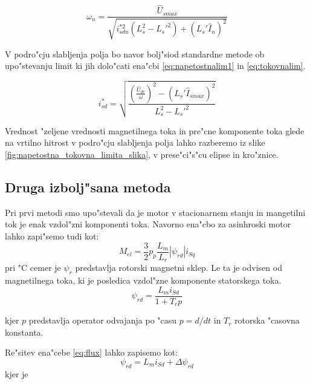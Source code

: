 \documentclass[journal,a4paper,twoside]{sty/IEEEtran}
\begin{document}
\begin{equation}
\omega_n=\frac{\hat{U}_{smax}}{\sqrt{i_{sdn}^{*2}(L_s^2-L_s'^2)+(L_s'\hat{I}_n)^2}}
\label{nazivnaw}
\end{equation}



V podro"cju slabljenja polja bo navor bolj"siod standardne metode ob upo"stevanju limit ki jih dolo"cati ena"cbi \ref{eq:napetostnalim1} in \ref{eq:tokovnalim}. 

\begin{equation}
\label{eq:zeljentok1}
i_{sd}^*=\sqrt{\frac{(\frac{\hat{U}_{dc}}{\omega})^2-(L_s'\hat{I}_{smax})^2}{L_s^2-L_s'^2}}
\end{equation}

Vrednost "zeljene vrednosti magnetilnega toka in pre"cne komponente toka glede na vrtilno hitrost v podro"cju slabljenja polja lahko razberemo iz slike \ref{fig:napetostna_tokovna_limita_slika}, v prese"ci"s"cu elipse in kro"znice. 














\subsection{Druga izbolj"sana metoda}


Pri prvi metodi smo upo"stevali da je motor v stacionarnem stanju in mangetilni tok je enak vzdol"zni komponenti toka.
Navorno ena"cbo za asinhroski motor lahko zapi"semo tudi kot:
\begin{equation}
\label{eq:navor2}
M_{el}=\frac{3}{2}p_p \frac{L_m}{L_r}|\psi_{rd}|i_{Sq}
\end{equation}
 pri "C
cemer je $\psi_{r}$ predstavlja rotorski magnetni sklep. Le ta je odvisen od magnetilnega toka, ki je posledica vzdol"zne komponente statorskega toka.
\begin{equation}
\label{eq:flux}
\psi_{rd}= \frac{L_m i_{Sd}}{1+T_r p}
\end{equation}

kjer $p$ predstavlja operator odvajanja po "casu $p=d/dt$ in $T_r$ rotorska "casovna konstanta.

Re"sitev ena"cebe \ref{eq:flux} lahko zapisemo kot:
\begin{equation}
\label{eq:Lm+delta}
\psi_{rd}=L_m i_{Sd}+\Delta \psi_{rd}
\end{equation}
 kjer je
 
\end{document}
